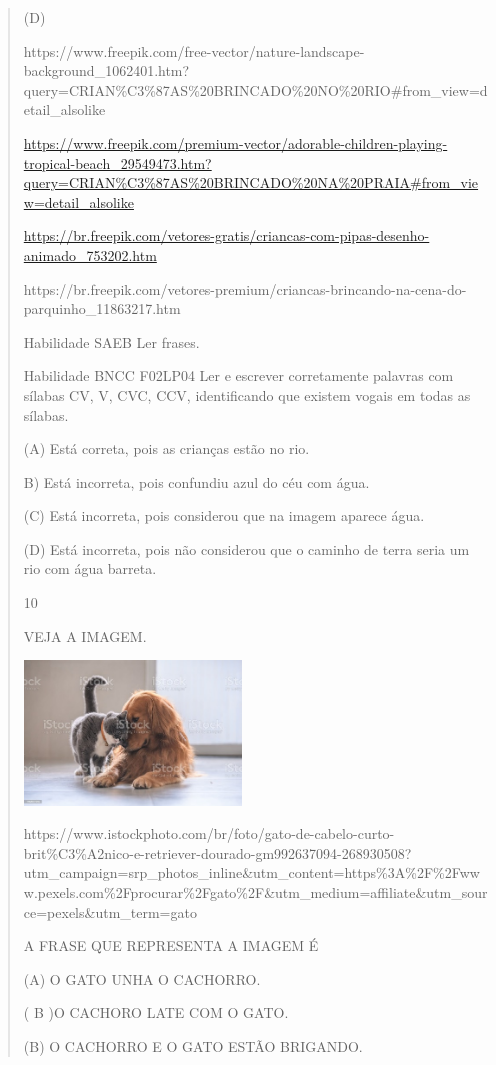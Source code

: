 \begin{verse}
{{{{{{{{{{{{{{{{{{{{(D)

https://www.freepik.com/free-vector/nature-landscape-background\_1062401.htm?query=CRIAN\%C3\%87AS\%20BRINCADO\%20NO\%20RIO\#from\_view=detail\_alsolike

\url{https://www.freepik.com/premium-vector/adorable-children-playing-tropical-beach_29549473.htm?query=CRIAN\%C3\%87AS\%20BRINCADO\%20NA\%20PRAIA\#from_view=detail_alsolike}

\url{https://br.freepik.com/vetores-gratis/criancas-com-pipas-desenho-animado_753202.htm}

https://br.freepik.com/vetores-premium/criancas-brincando-na-cena-do-parquinho\_11863217.htm

Habilidade SAEB Ler frases.

Habilidade BNCC F02LP04 Ler e escrever corretamente palavras com sílabas
CV, V, CVC, CCV, identificando que existem vogais em todas as sílabas.

(A) Está correta, pois as crianças estão no rio.

B) Está incorreta, pois confundiu azul do céu com água.

(C) Está incorreta, pois considerou que na imagem aparece água.

(D) Está incorreta, pois não considerou que o caminho de terra seria um
rio com água barreta.

\num{10}

VEJA A IMAGEM.

\includegraphics[width=2.27539in,height=1.51515in]{media/image158.jpeg}

https://www.istockphoto.com/br/foto/gato-de-cabelo-curto-brit\%C3\%A2nico-e-retriever-dourado-gm992637094-268930508?utm\_campaign=srp\_photos\_inline\&utm\_content=https\%3A\%2F\%2Fwww.pexels.com\%2Fprocurar\%2Fgato\%2F\&utm\_medium=affiliate\&utm\_source=pexels\&utm\_term=gato

A FRASE QUE REPRESENTA A IMAGEM É

(A) O GATO UNHA O CACHORRO.

( B )O CACHORO LATE COM O GATO.

(B) O CACHORRO E O GATO ESTÃO BRIGANDO.

}}}}}}}}}}}}}}}}}}}}
\end{verse}
